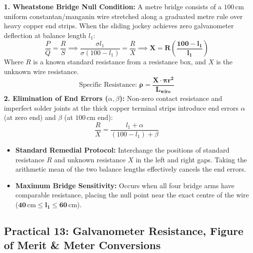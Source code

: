 \documentclass[10pt,twoside,openright]{book}
\begin{document}
\begin{formulabox}
\textbf{1. Wheatstone Bridge Null Condition:}
A metre bridge consists of a $100\,\mathrm{cm}$ uniform constantan/manganin wire stretched along a graduated metre rule over heavy copper end strips. When the sliding jockey achieves zero galvanometer deflection at balance length $l_1$:
\begin{equation}
  \frac{P}{Q} = \frac{R}{S} \implies \frac{\sigma l_1}{\sigma (100 - l_1)} = \frac{R}{X} \implies \mathbf{X = R \left(\frac{100 - l_1}{l_1}\right)}
\end{equation}
Where $R$ is a known standard resistance from a resistance box, and $X$ is the unknown wire resistance.
\begin{equation}
  \text{Specific Resistance: } \mathbf{\rho = \frac{X \cdot \pi r^2}{L_{\text{wire}}}}
\end{equation}
\textbf{2. Elimination of End Errors ($\alpha, \beta$):}
Non-zero contact resistance and imperfect solder joints at the thick copper terminal strips introduce end errors $\alpha$ (at zero end) and $\beta$ (at $100\,\mathrm{cm}$ end):
\begin{equation}
  \frac{R}{X} = \frac{l_1 + \alpha}{(100 - l_1) + \beta}
\end{equation}
\begin{itemize}
  \item \textbf{Standard Remedial Protocol:} Interchange the positions of standard resistance $R$ and unknown resistance $X$ in the left and right gaps. Taking the arithmetic mean of the two balance lengths effectively cancels the end errors.
  \item \textbf{Maximum Bridge Sensitivity:} Occurs when all four bridge arms have comparable resistance, placing the null point near the exact centre of the wire ($\mathbf{40\,\mathrm{cm} \le l_1 \le 60\,\mathrm{cm}}$).
\end{itemize}
\end{formulabox}

\subsection{Practical 13: Galvanometer Resistance, Figure of Merit \& Meter Conversions}
\end{document}
